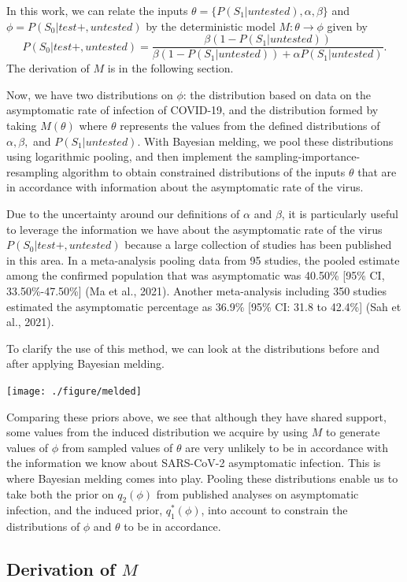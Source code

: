 \documentclass[12pt,twoside]{smiththesis}
\begin{document}
In this work, we can relate the inputs \(\theta = \{P(S_1|untested), \alpha, \beta \}\) and \(\phi = P(S_0|test +,untested)\) by the deterministic model \(M: \theta \to \phi\) given by
\[P(S_0|test+, untested) = \frac{\beta(1 - P(S_1|untested))}{\beta(1-P(S_1|untested)) + \alpha P(S_1|untested)}.\] The derivation of \(M\) is in the following section.

Now, we have two distributions on \(\phi\): the distribution based on data on the asymptomatic rate of infection of COVID-19, and the distribution formed by taking \(M(\theta)\) where \(\theta\) represents the values from the defined distributions of \(\alpha,\beta,\) and \(P(S_1|untested)\). With Bayesian melding, we pool these distributions using logarithmic pooling, and then implement the sampling-importance-resampling algorithm to obtain constrained distributions of the inputs \(\theta\) that are in accordance with information about the asymptomatic rate of the virus.

Due to the uncertainty around our definitions of \(\alpha\) and \(\beta\), it is particularly useful to leverage the information we have about the asymptomatic rate of the virus \(P(S_0|test +,untested)\) because a large collection of studies has been published in this area. In a meta-analysis pooling data from 95 studies, the pooled estimate among the confirmed population that was asymptomatic was 40.50\% {[}95\% CI, 33.50\%-47.50\%{]} (Ma et al., 2021). Another meta-analysis including 350 studies estimated the asymptomatic percentage as 36.9\% {[}95\% CI: 31.8 to 42.4\%{]} (Sah et al., 2021).

To clarify the use of this method, we can look at the distributions before and after applying Bayesian melding.

\texttt{[image: ./figure/melded]}

Comparing these priors above, we see that although they have shared support, some values from the induced distribution we acquire by using \(M\) to generate values of \(\phi\) from sampled values of \(\theta\) are very unlikely to be in accordance with the information we know about SARS-CoV-2 asymptomatic infection. This is where Bayesian melding comes into play. Pooling these distributions enable us to take both the prior on \(q_2(\phi)\) from published analyses on asymptomatic infection, and the induced prior, \(q_1^*(\phi)\), into account to constrain the distributions of \(\phi\) and \(\theta\) to be in accordance.

\hypertarget{derivation-of-m}{%
\subsection{\texorpdfstring{Derivation of \(M\)}{Derivation of M}}\label{derivation-of-m}}
\end{document}
